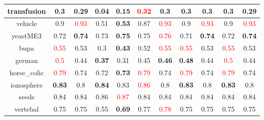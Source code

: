 \documentclass{article}%
\begin{document}
\begin{tabular}{c|cccccccccc}
\hline%
transfusion&\textbf{0.3}&0.29&0.04&\textbf{0.15}&\textcolor{red}{ 
0.32
}&0.3&0.3&0.3&\textbf{0.3}&0.29\\%
\hline%
vehicle&0.9&\textcolor{red}{ 
0.93
}&0.51&\textbf{0.53}&0.87&\textcolor{red}{ 
0.93
}&0.9&\textcolor{red}{ 
0.93
}&0.9&\textcolor{red}{ 
0.93
}\\%
\hline%
yeastME3&0.72&\textbf{0.74}&0.73&\textbf{0.75}&0.75&\textcolor{red}{ 
0.76
}&0.71&\textbf{0.74}&0.72&\textbf{0.74}\\%
\hline%
bupa&\textcolor{red}{ 
0.55
}&0.53&0.3&\textbf{0.43}&0.52&\textcolor{red}{ 
0.55
}&\textcolor{red}{ 
0.55
}&0.53&\textcolor{red}{ 
0.55
}&0.53\\%
\hline%
german&\textcolor{red}{ 
0.5
}&0.44&\textbf{0.37}&0.31&0.45&\textbf{0.46}&\textbf{0.48}&0.44&\textcolor{red}{ 
0.5
}&0.44\\%
\hline%
horse\_colic&\textcolor{red}{ 
0.79
}&0.74&0.72&\textbf{0.73}&\textcolor{red}{ 
0.79
}&0.74&\textcolor{red}{ 
0.79
}&0.74&\textcolor{red}{ 
0.79
}&0.74\\%
\hline%
ionosphere&\textbf{0.83}&0.8&\textbf{0.84}&0.83&\textcolor{red}{ 
0.86
}&0.8&\textbf{0.83}&0.8&\textbf{0.83}&0.8\\%
\hline%
seeds&0.84&0.84&0.86&\textcolor{red}{ 
0.87
}&0.84&0.84&0.84&0.84&0.84&0.84\\%
\hline%
vertebal&0.75&0.75&0.55&\textbf{0.69}&0.77&\textcolor{red}{ 
0.78
}&0.75&0.75&0.75&0.75\\%
\hline%
\end{tabular}

%
\end{document}
